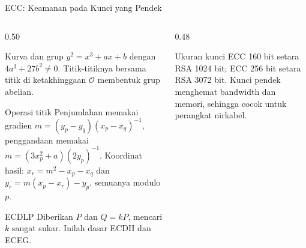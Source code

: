 \documentclass[aspectratio=169,11pt]{beamer}
\begin{document}
\begin{frame}{ECC: Keamanan pada Kunci yang Pendek}
    \scriptsize
    \begin{columns}[T,onlytextwidth]
        \begin{column}{0.50\textwidth}
            \begin{block}{Kurva dan grup}
                $y^{2}=x^{3}+ax+b$ dengan $4a^{3}+27b^{2}\neq0$. Titik-titiknya
                bersama titik di ketakhinggaan $\mathcal{O}$ membentuk grup
                abelian.
            \end{block}
            \begin{block}{Operasi titik}
                Penjumlahan memakai gradien
                $m=(y_p-y_q)(x_p-x_q)^{-1}$, penggandaan memakai
                $m=(3x_p^{2}+a)(2y_p)^{-1}$. Koordinat hasil:
                $x_r=m^{2}-x_p-x_q$ dan
                $y_r=m(x_p-x_r)-y_p$, semuanya modulo $p$.
            \end{block}
            \begin{alertblock}{ECDLP}
                Diberikan $P$ dan $Q=kP$, mencari $k$ sangat sukar. Inilah dasar
                ECDH dan ECEG.
            \end{alertblock}
        \end{column}
        \begin{column}{0.48\textwidth}
            \centering
            \vspace{0.1cm}
            \begin{exampleblock}{Ukuran kunci}
                \footnotesize
                ECC 160 bit setara RSA 1024 bit; ECC 256 bit setara RSA
                3072 bit. Kunci pendek menghemat bandwidth dan memori, sehingga
                cocok untuk perangkat nirkabel.
            \end{exampleblock}
        \end{column}
    \end{columns}
\end{frame}
\end{document}
